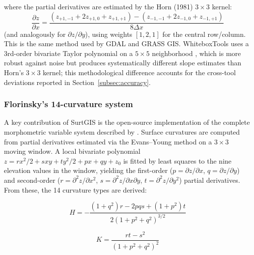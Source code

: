 \documentclass[preprint,review,12pt,authoryear]{elsarticle}
\begin{document}
\noindent where the partial derivatives are estimated by the Horn (1981) $3 \times 3$ kernel:
\begin{equation}
\frac{\partial z}{\partial x} = \frac{(z_{+1,-1} + 2z_{+1,0} + z_{+1,+1}) - (z_{-1,-1} + 2z_{-1,0} + z_{-1,+1})}{8 \Delta x}
\label{eq:horn_kernel}
\end{equation}
\noindent (and analogously for $\partial z / \partial y$), using weights $[1, 2, 1]$ for the central row/column. This is the same method used by GDAL and GRASS GIS. WhiteboxTools uses a 3rd-order bivariate Taylor polynomial on a $5 \times 5$ neighborhood \citep{florinsky2016}, which is more robust against noise but produces systematically different slope estimates than Horn's $3 \times 3$ kernel; this methodological difference accounts for the cross-tool deviations reported in Section~\ref{subsec:accuracy}.

\subsubsection{Florinsky's 14-curvature system}

A key contribution of SurtGIS is the open-source implementation of the complete morphometric variable system described by \citet{florinsky2025}. Surface curvatures are computed from partial derivatives estimated via the Evans--Young method \citep{evans1972} on a $3\times3$ moving window. A local bivariate polynomial $z = rx^2/2 + sxy + ty^2/2 + px + qy + z_0$ is fitted by least squares to the nine elevation values in the window, yielding the first-order ($p = \partial z/\partial x$, $q = \partial z/\partial y$) and second-order ($r = \partial^2 z/\partial x^2$, $s = \partial^2 z/\partial x \partial y$, $t = \partial^2 z/\partial y^2$) partial derivatives. From these, the 14 curvature types are derived:

\begin{equation}
H = -\frac{(1+q^2)r - 2pqs + (1+p^2)t}{2(1+p^2+q^2)^{3/2}}
\label{eq:mean_curv}
\end{equation}

\begin{equation}
K = \frac{rt - s^2}{(1+p^2+q^2)^2}
\label{eq:gauss_curv}
\end{equation}
\end{document}
